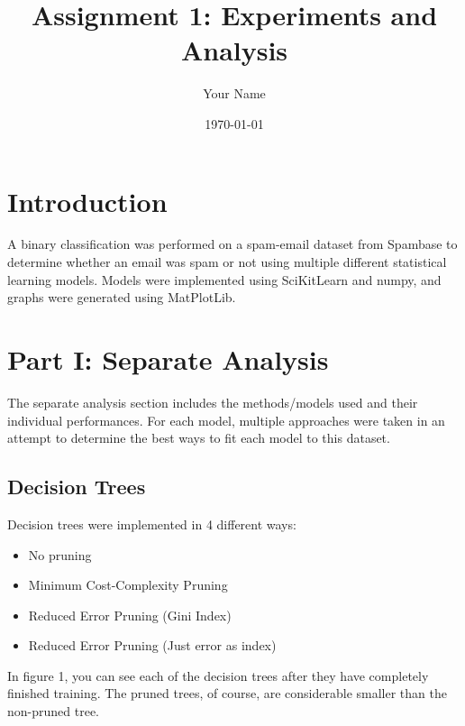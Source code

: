 \documentclass[12pt]{article}
\title{Assignment 1: Experiments and Analysis}
\author{Your Name}
\date{\today}
\begin{document}
\maketitle
\tableofcontents
\newpage

\section{Introduction}
A binary classification was performed on a spam-email dataset from Spambase to determine whether an email was spam or not using multiple different statistical learning models. Models were implemented using SciKitLearn and numpy, and graphs were generated using MatPlotLib.


\section{Part I: Separate Analysis}
The separate analysis section includes the methods/models used and their individual performances. For each model, multiple approaches were taken in an attempt to determine the best ways to fit each model to this dataset.

\subsection{Decision Trees}

Decision trees were implemented in 4 different ways:

\begin{itemize}
    \item No pruning
    \item Minimum Cost-Complexity Pruning
    \item Reduced Error Pruning (Gini Index)
    \item Reduced Error Pruning (Just error as index)
\end{itemize}

In figure 1, you can see each of the decision trees after they have completely finished training. The pruned trees, of course, are considerable smaller than the non-pruned tree.
\end{document}

